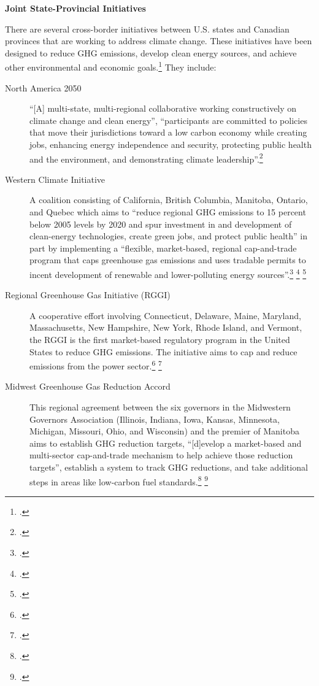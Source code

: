 \documentclass[10pt]{article}
\begin{document}
\textbf{Joint State-Provincial Initiatives}



There are several cross-border initiatives between U.S. states and Canadian provinces that are working to address climate change.
These initiatives have been designed to reduce GHG emissions, develop clean energy sources, and achieve other environmental and economic goals.\footcite[][]{CCESinitiatives} 
They include:
\begin{description}
	\item[North America 2050] ``[A] multi-state, multi-regional collaborative working constructively on climate change and clean energy'', ``participants are committed to policies that move their jurisdictions toward a low carbon economy while creating jobs, enhancing energy independence and security, protecting public health and the environment, and demonstrating climate leadership''.\footcite[][]{CCESinitiatives}
	\item[Western Climate Initiative] A coalition consisting of California, British Columbia, Manitoba, Ontario, and Quebec which aims to ``reduce regional GHG emissions to 15 percent below 2005 levels by 2020 and spur investment in and development of clean-energy technologies, create green jobs, and protect public health'' in part by implementing a ``flexible, market-based, regional cap-and-trade program that caps greenhouse gas emissions and uses tradable permits to incent development of renewable and lower-polluting energy sources''.\footcite[][]{WCIPartners} \footcite[][]{WCIProgram} \footcite[][]{CCESinitiatives}
	\item[Regional Greenhouse Gas Initiative (RGGI)] A cooperative effort involving Connecticut, Delaware, Maine, Maryland, Massachusetts, New Hampshire, New York, Rhode Island, and Vermont, the RGGI is the first market-based regulatory program in the United States to reduce GHG emissions. The initiative aims to cap and reduce  emissions from the power sector.\footcite[][]{RGGIWelcome} \footcite[][]{CCESinitiatives}
	\item[Midwest Greenhouse Gas Reduction Accord] This regional agreement between the six governors in the Midwestern Governors Association (Illinois, Indiana, Iowa, Kansas, Minnesota, Michigan, Missouri, Ohio, and Wisconsin) and the premier of Manitoba aims to establish GHG reduction targets, ``[d]evelop a market-based and multi-sector cap-and-trade mechanism to help achieve those reduction targets'', establish a system to track GHG reductions, and take additional steps in areas like low-carbon fuel standards.\footcite[][]{GovsClimatePlatform} \footcite[][]{CCESinitiatives}

\end{description}
\end{document}
